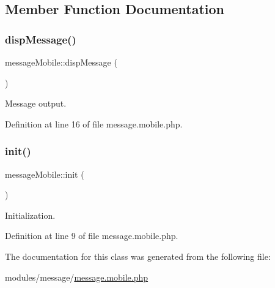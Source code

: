 \subsection{Member Function Documentation}
\hypertarget{classmessageMobile_af0b28b049852fcf98444faceed1977fa}{}\label{classmessageMobile_af0b28b049852fcf98444faceed1977fa} 
\subsubsection{\texorpdfstring{disp\+Message()}{dispMessage()}}
{\footnotesize\ttfamily message\+Mobile\+::disp\+Message (\begin{DoxyParamCaption}{ }\end{DoxyParamCaption})}



Message output. 



Definition at line 16 of file message.\+mobile.\+php.

\hypertarget{classmessageMobile_adbf0b398e93a9a202811c9149d51838c}{}\label{classmessageMobile_adbf0b398e93a9a202811c9149d51838c} 
\subsubsection{\texorpdfstring{init()}{init()}}
{\footnotesize\ttfamily message\+Mobile\+::init (\begin{DoxyParamCaption}{ }\end{DoxyParamCaption})}



Initialization. 



Definition at line 9 of file message.\+mobile.\+php.



The documentation for this class was generated from the following file\+:\begin{DoxyCompactItemize}
\item 
modules/message/\hyperlink{message_8mobile_8php}{message.\+mobile.\+php}\end{DoxyCompactItemize}
